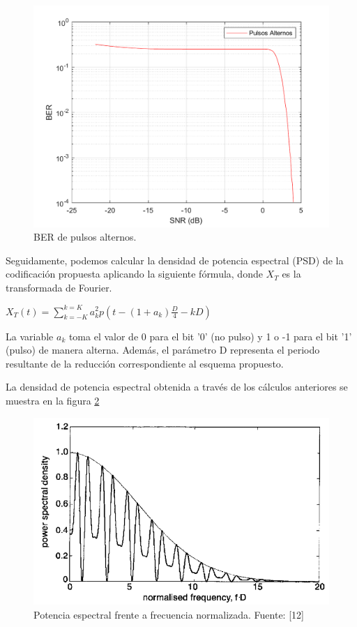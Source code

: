 \begin{figure}[ht]
    \centering
    \includegraphics[scale=0.27]{./figuras/solo_soft_alternos.pdf}
    \caption{\small{BER de pulsos alternos.}}
    \label{solo_soft_alternos}%
\end{figure}

Seguidamente, podemos calcular la densidad de potencia espectral (PSD) de la 
codificación propuesta aplicando la siguiente fórmula, 
donde $ X_T $ es la transformada de Fourier. \cite{anto_alt}

$ X_T(t) = \sum_{k=-K}^{k=K}a_k^2p(t-(1+a_k)\frac{D}{4}-kD)$

La variable $a_k$ toma el valor de 0 para el bit '0' (no pulso) y 1 o -1 para el bit 
'1' (pulso) de manera alterna. Además, el parámetro D representa el periodo resultante 
de la reducción correspondiente al esquema propuesto.

La densidad de potencia espectral obtenida a través de los cálculos
anteriores se muestra en la figura \ref{psd_alternos}
\begin{figure}[ht]
    \centering
    \includegraphics[scale=0.37]{./figuras/psd_alternos.png}
    \caption{\small{Potencia espectral frente a frecuencia normalizada. Fuente: [12]}}
    \label{psd_alternos}%
\end{figure}

